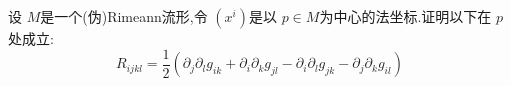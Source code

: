 \documentclass[../../几何与拓扑.tex]{subfiles}
\begin{document}
    
\ifSubfilesClassLoaded{
    \frontmatter

    \tableofcontents
    
    \mainmatter
}{}

\begin{problemsec}

\end{problemsec}

\begin{problem}
    设 \(  M  \)是一个(伪)Rimeann流形,令 \(  \left( x^{i} \right)   \)是以 \(  p \in M  \)为中心的法坐标.证明以下在 \(  p  \)处成立: \[
    R_{ijkl}= \frac{1 }{2 } \left( \partial _{j}\partial _{l}g_{ik}+ \partial _{i}\partial _{k}g_{jl}-\partial _{i}\partial _{l}g_{jk}-\partial _{j}\partial _{k}g_{il} \right)  
    \]    
\end{problem}

\hspace*{\fill} 
\end{document}

